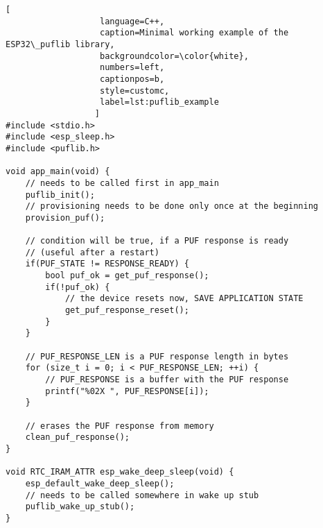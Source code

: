 \begin{lstlisting}[
                   language=C++,
                   caption=Minimal working example of the ESP32\_puflib library,
                   backgroundcolor=\color{white},
                   numbers=left,
                   captionpos=b,
                   style=customc,
                   label=lst:puflib_example
                  ]
#include <stdio.h>
#include <esp_sleep.h>
#include <puflib.h>

void app_main(void) { 
    // needs to be called first in app_main
    puflib_init();
    // provisioning needs to be done only once at the beginning
    provision_puf();

    // condition will be true, if a PUF response is ready
    // (useful after a restart)
    if(PUF_STATE != RESPONSE_READY) {
        bool puf_ok = get_puf_response();
        if(!puf_ok) {
            // the device resets now, SAVE APPLICATION STATE
            get_puf_response_reset();
        }
    }

    // PUF_RESPONSE_LEN is a PUF response length in bytes
    for (size_t i = 0; i < PUF_RESPONSE_LEN; ++i) {
        // PUF_RESPONSE is a buffer with the PUF response
        printf("%02X ", PUF_RESPONSE[i]);
    }

    // erases the PUF response from memory
    clean_puf_response();
}

void RTC_IRAM_ATTR esp_wake_deep_sleep(void) {
    esp_default_wake_deep_sleep();
    // needs to be called somewhere in wake up stub
    puflib_wake_up_stub();
}
\end{lstlisting}

